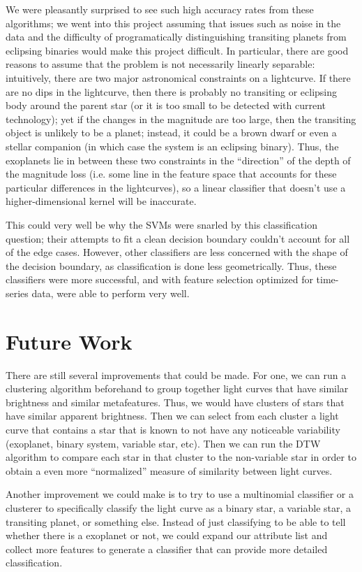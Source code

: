 \documentclass{amsart}
\begin{document}
We were pleasantly surprised to see such high accuracy rates from these algorithms; we went into this project assuming that issues such as noise in the data and the difficulty of programatically distinguishing transiting planets from eclipsing binaries would make this project difficult. In particular, there are good reasons to assume that the problem is not necessarily linearly separable: intuitively, there are two major astronomical constraints on a lightcurve. If there are no dips in the lightcurve, then there is probably no transiting or eclipsing body around the parent star (or it is too small to be detected with current technology); yet if the changes in the magnitude are too large, then the transiting object is unlikely to be a planet; instead, it could be a brown dwarf or even a stellar companion (in which case the system is an eclipsing binary). Thus, the exoplanets lie in between these two constraints in the ``direction'' of the depth of the magnitude loss (i.e. some line in the feature space that accounts for these particular differences in the lightcurves), so a linear classifier that doesn't use a higher-dimensional kernel will be inaccurate.

This could very well be why the SVMs were snarled by this classification question; their attempts to fit a clean decision boundary couldn't account for all of the edge cases. However, other classifiers are less concerned with the shape of the decision boundary, as classification is done less geometrically. Thus, these classifiers were more successful, and with feature selection optimized for time-series data, were able to perform very well.
\section{Future Work}
There are still several improvements that could be made. For one, we can run a clustering algorithm beforehand to group together light curves that have similar brightness and similar metafeatures. Thus, we would have clusters of stars that have similar apparent brightness. Then we can select from each cluster a light curve that contains a star that is known to not have any noticeable variability (exoplanet, binary system, variable star, etc). Then we can run the DTW algorithm to compare each star in that cluster to the non-variable star in order to obtain a even more ``normalized'' measure of similarity between light curves. 

Another improvement we could make is to try to use a multinomial classifier or a clusterer to specifically classify the light curve as a binary star, a variable star, a transiting planet, or something else. Instead of just classifying to be able to tell whether there is a exoplanet or not, we could expand our attribute list and collect more features to generate a classifier that can provide more detailed classification. 
\end{document}
